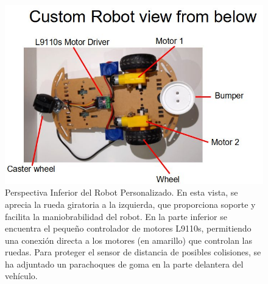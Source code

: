 \begin{figure}[h!]
	\centering\includegraphics[width=\imsize]{robot_nuestro2.png}
	\caption[ Perspectiva Inferior del Robot Personalizado.]{ Perspectiva Inferior del Robot Personalizado. En esta vista, se aprecia la rueda giratoria a la izquierda, que proporciona soporte y facilita la maniobrabilidad del robot. En la parte inferior se encuentra el pequeño controlador de motores L9110s, permitiendo una conexión directa a los motores (en amarillo) que controlan las ruedas. Para proteger el sensor de distancia de posibles colisiones, se ha adjuntado un parachoques de goma en la parte delantera del vehículo.}\label{fig:robot_nuestro2}
\end{figure}


